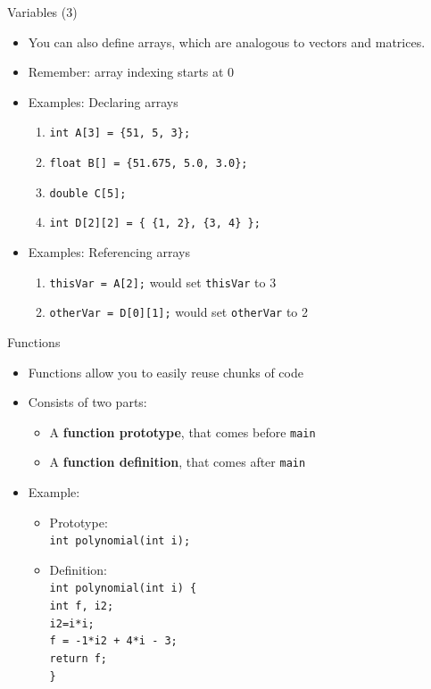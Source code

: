\documentclass[compress]{beamer}
\newcommand{\tab}{\hspace*{1em}}
\begin{document}
    \begin{frame}{Variables (3)}
    	\begin{itemize}
    		\item You can also define arrays, which are analogous to vectors and matrices.
    		\item Remember: array indexing starts at 0
    		\item Examples: Declaring arrays
    		\begin{enumerate}
    			\item \texttt{int A[3] = \{51, 5, 3\};}
    			\item \texttt{float B[] = \{51.675, 5.0, 3.0\};}
    			\item \texttt{double C[5];}
    			\item \texttt{int D[2][2] = \{ \{1, 2\}, \{3, 4\} \};}
    		\end{enumerate}
    		\item Examples: Referencing arrays
    		\begin{enumerate}
    			\item \texttt{thisVar = A[2];} would set \texttt{thisVar} to 3
    			\item \texttt{otherVar = D[0][1];} would set \texttt{otherVar} to 2
    		\end{enumerate}
    	\end{itemize}
    \end{frame}
    
    \begin{frame}{Functions}
    	\begin{itemize}
    		\item Functions allow you to easily reuse chunks of code
    		\item Consists of two parts:
    		\begin{itemize}
    			\item A \textbf{function prototype}, that comes before \texttt{main}
    			\item A \textbf{function definition}, that comes after \texttt{main}
    		\end{itemize}
    		\item Example:
    		\begin{itemize}
    			\item Prototype: \texttt{\\ \tab int polynomial(int i);}
    			\item Definition:
    			\texttt{ \\ \tab int polynomial(int i) \{ \\
    				\tab \tab int f, i2; \\
    				\tab \tab i2=i*i; \\
    				\tab \tab f = -1*i2 + 4*i - 3; \\
    				\tab \tab return f; \\
    				\tab \}
    			}
    		\end{itemize}
    	\end{itemize}
    \end{frame}
    
\end{document}
